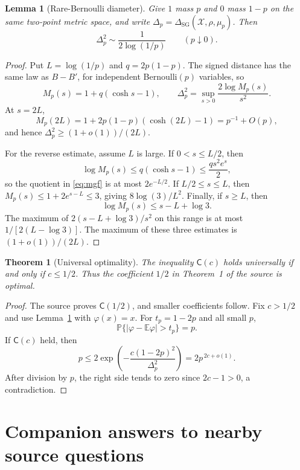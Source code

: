\documentclass[11pt]{article}
\newtheorem{theorem}{Theorem}
\newtheorem{lemma}{Lemma}
\newcommand{\DSG}{\Delta_{\mathrm{SG}}}
\newcommand{\E}{\mathbb E}
\newcommand{\Pp}{\mathbb P}
\begin{document}
\begin{lemma}[Rare-Bernoulli diameter]\label{lem:asymptotic}
Give $1$ mass $p$ and $0$ mass $1-p$ on the same two-point metric space, and
write $\Delta_p=\DSG(\mathcal X,\rho,\mu_p)$. Then
\[
              \Delta_p^2\sim\frac{1}{2\log(1/p)}
              \qquad(p\downarrow0).
\]
\end{lemma}

\begin{proof}
Put $L=\log(1/p)$ and $q=2p(1-p)$. The signed distance has the same law as
$B-B'$, for independent Bernoulli$(p)$ variables, so
\begin{equation}\label{eq:mgf}
 M_p(s)=1+q(\cosh s-1),\qquad
 \Delta_p^2=\sup_{s>0}\frac{2\log M_p(s)}{s^2}.
\end{equation}
At $s=2L$,
\[
 M_p(2L)=1+2p(1-p)(\cosh(2L)-1)=p^{-1}+O(p),
\]
and hence $\Delta_p^2\geq(1+o(1))/(2L)$.

For the reverse estimate, assume $L$ is large. If $0<s\leq L/2$, then
\[
 \log M_p(s)\leq q(\cosh s-1)\leq\frac{q s^2e^s}{2},
\]
so the quotient in \eqref{eq:mgf} is at most $2e^{-L/2}$.
If $L/2\leq s\leq L$, then
$M_p(s)\leq1+2e^{s-L}\leq3$, giving $8\log(3)/L^2$.
Finally, if $s\geq L$, then
\[
 \log M_p(s)\leq s-L+\log3.
\]
The maximum of $2(s-L+\log3)/s^2$ on this range is at most
$1/[2(L-\log3)]$. The maximum of these three estimates is
$(1+o(1))/(2L)$.
\end{proof}

\begin{theorem}[Universal optimality]\label{thm:sharp}
The inequality $\mathsf C(c)$ holds universally if and only if $c\leq1/2$.
Thus the coefficient $1/2$ in Theorem~1 of the source is optimal.
\end{theorem}

\begin{proof}
The source proves $\mathsf C(1/2)$, and smaller coefficients follow. Fix
$c>1/2$ and use Lemma~\ref{lem:asymptotic} with $\varphi(x)=x$. For
$t_p=1-2p$ and all small $p$,
\[
 \Pp\{|\varphi-\E\varphi|>t_p\}=p.
\]
If $\mathsf C(c)$ held, then
\[
 p\leq2\exp\!\left(-\frac{c(1-2p)^2}{\Delta_p^2}\right)
 =2p^{\,2c+o(1)}.
\]
After division by $p$, the right side tends to zero since $2c-1>0$, a
contradiction.
\end{proof}

\section{Companion answers to nearby source questions}
\end{document}

